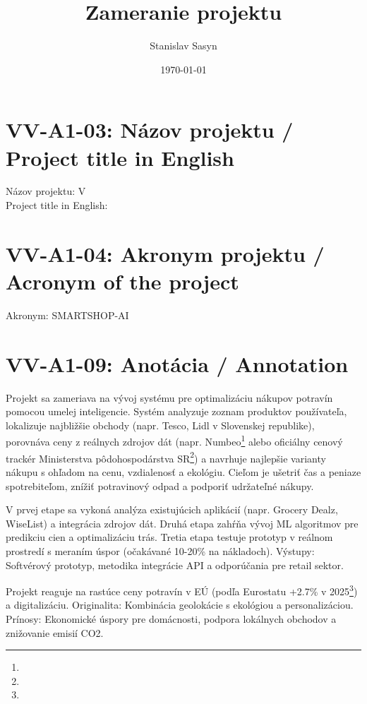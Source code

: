 \documentclass[a4paper,12pt]{article}
\begin{document}
\title{Zameranie projektu}
\author{Stanislav Sasyn}
\date{\today}
\maketitle

\section*{VV-A1-03: Názov projektu / Project title in English}
Názov projektu: V \\
Project title in English: 
\section*{VV-A1-04: Akronym projektu / Acronym of the project}
Akronym: SMARTSHOP-AI

\section*{VV-A1-09: Anotácia / Annotation }
Projekt sa zameriava na vývoj  systému pre optimalizáciu nákupov potravín pomocou umelej inteligencie. 
Systém analyzuje zoznam produktov používateľa, lokalizuje najbližšie obchody (napr. Tesco, Lidl v Slovenskej republike), 
porovnáva ceny z reálnych zdrojov dát (napr. Numbeo\footnote{} alebo oficiálny cenový trackér Ministerstva pôdohospodárstva SR\footnote{}) 
a navrhuje najlepšie varianty nákupu s ohľadom na cenu, vzdialenosť a ekológiu. Cieľom je ušetriť čas a peniaze spotrebiteľom, 
znížiť potravinový odpad a podporiť udržateľné nákupy.

V prvej etape sa vykoná analýza existujúcich aplikácií (napr. Grocery Dealz, WiseList) a integrácia zdrojov dát. 
Druhá etapa zahŕňa vývoj ML algoritmov pre predikciu cien a optimalizáciu trás. 
Tretia etapa testuje prototyp v reálnom prostredí s meraním úspor (očakávané 10-20\% na nákladoch). 
Výstupy: Softvérový prototyp, metodika integrácie API a odporúčania pre retail sektor.

Projekt reaguje na rastúce ceny potravín v EÚ (podľa Eurostatu +2.7\% v 2025\footnote{}) a digitalizáciu. 
Originalita: Kombinácia geolokácie s ekológiou a personalizáciou. 
Prínosy: Ekonomické úspory pre domácnosti, podpora lokálnych obchodov a znižovanie emisií CO2.


\end{document}
